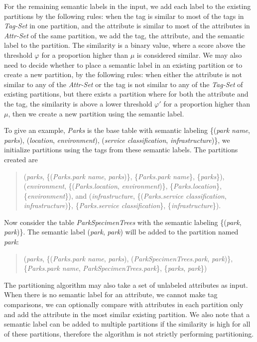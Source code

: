 For the remaining semantic labels in the input, we add each label to the existing partitions by the following rules: when the tag is similar to most of the tags in \textit{Tag-Set} in one partition, and the attribute is similar to most of the attributes in \textit{Attr-Set} of the same partition, we add the tag, the attribute, and the semantic label to the partition. The similarity is a binary value, where a score above the threshold $\varphi$ for a proportion higher than $\mu$ is considered similar. We may also need to decide whether to place a semantic label in an existing partition or to create a new partition, by the following rules: when either the attribute is not similar to any of the \textit{Attr-Set} or the tag is not similar to any of the \textit{Tag-Set} of existing partitions, but there exists a partition where for both the attribute and the tag, the similarity is above a lower threshold $\varphi '$ for a proportion higher than $\mu$, then we create a new partition using the semantic label.

To give an example, \textit{Parks} is the base table with semantic labeling \{(\textit{park name}, \textit{parks}), (\textit{location}, \textit{environment}), (\textit{service classification}, \textit{infrastructure})\}, we initialize partitions using the tags from these semantic labels. The partitions created are
\begin{quote}
(\textit{parks}, \{(\textit{Parks.park name}, \textit{parks})\}, \{\textit{Parks.park name}\}, \{\textit{parks}\}),
(\textit{environment}, \{(\textit{Parks.location}, \textit{environment})\}, \{\textit{Parks.location}\}, \{\textit{environment}\}), and
(\textit{infrastructure}, \{(\textit{Parks.service classification}, \textit{infrastructure})\}, \{\textit{Parks.service classification}\}, \{\textit{infrastructure}\}).
\end{quote}

Now consider the table \textit{ParkSpecimenTrees} with the semantic labeling \{(\textit{park}, \textit{park})\}. The semantic label (\textit{park}, \textit{park}) will be added to the partition named \textit{park}:
\begin{quote}
(\textit{parks}, \{(\textit{Parks.park name}, \textit{parks}), (\textit{ParkSpecimenTrees.park}, \textit{park})\}, \{\textit{Parks.park name}, \textit{ParkSpecimenTrees.park}\}, \{\textit{parks}, \textit{park}\})
\end{quote}

The partitioning algorithm may also take a set of unlabeled attributes as input. When there is no semantic label for an attribute, we cannot make tag comparisons, we can optionally compare with attributes in each partition only and add the attribute in the most similar existing partition. We also note that a semantic label can be added to multiple partitions if the similarity is high for all of these partitions, therefore the algorithm is not strictly performing partitioning.
\endinput
